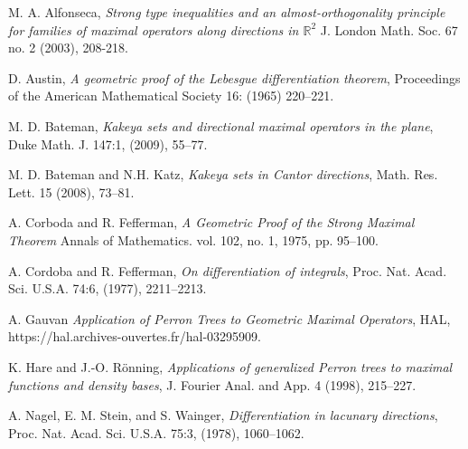 \documentclass{article}
\begin{document}
\begin{thebibliography}{}


M. A. Alfonseca, \emph{Strong type inequalities and an almost-orthogonality principle for families of maximal operators along directions in $\mathbb{R}^2$ } J. London Math. Soc. 67 no. 2 (2003), 208-218.

D. Austin, \emph{A geometric proof of the Lebesgue differentiation theorem}, Proceedings of the American Mathematical Society 16: (1965) 220–221.




M. D. Bateman, \emph{Kakeya sets and directional maximal operators in the plane}, Duke Math. J.
147:1, (2009), 55–77.

M. D. Bateman and N.H. Katz, \emph{Kakeya sets in Cantor directions}, Math. Res. Lett. 15 (2008), 73–81.

A. Corboda and R. Fefferman, \emph{A Geometric Proof of the Strong Maximal Theorem} Annals of Mathematics. vol. 102, no. 1, 1975, pp. 95–100.

A. Cordoba and R. Fefferman, \emph{On differentiation of integrals}, Proc. Nat. Acad. Sci.
U.S.A. 74:6, (1977), 2211–2213.




A. Gauvan
\emph{Application of Perron Trees to Geometric Maximal Operators}, HAL, https://hal.archives-ouvertes.fr/hal-03295909.




K. Hare and J.-O. Rönning, \emph{Applications of generalized Perron trees to maximal functions and density bases}, J. Fourier Anal. and App. 4 (1998), 215–227.

A. Nagel, E. M. Stein, and S. Wainger, \emph{ Differentiation in lacunary directions}, Proc.
Nat. Acad. Sci. U.S.A. 75:3, (1978), 1060–1062.


\end{thebibliography}{}
\end{document}

